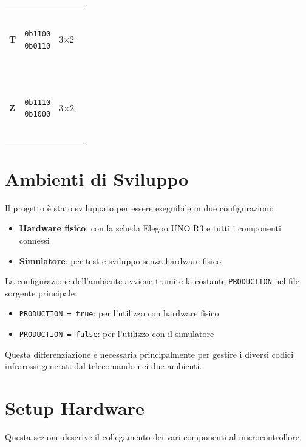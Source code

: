 \documentclass[a4paper, 12pt]{article}
\newcommand{\RedBlock}{\colorbox{red}{\rule{1.2ex}{1.2ex}}}      %
\newcommand{\WhiteBlock}{\fcolorbox{black}{white}{\rule{1.2ex}{1.2ex}}} %
\begin{document}
\begin{table}[H]
\begin{tabular}{
		>{\bfseries}l   %
		c               %
		c               %
		l               %
		}
		\addlinespace
		T     & \makecell{\texttt{0b1100}                                                 \\\texttt{0b0110}}
		& 3\(\times\)2
		& \makecell{\RedBlock\RedBlock\WhiteBlock\WhiteBlock                        \\\WhiteBlock\RedBlock\RedBlock\WhiteBlock} \\
		\addlinespace
		Z     & \makecell{\texttt{0b1110}                                                 \\\texttt{0b1000}}
		& 3\(\times\)2
		& \makecell{\RedBlock\RedBlock\RedBlock\WhiteBlock                          \\\RedBlock\WhiteBlock\WhiteBlock\WhiteBlock} \\
		\bottomrule
	\end{tabular}
\end{table}

\section{Ambienti di Sviluppo}
\label{sec:ambienti}
Il progetto è stato sviluppato per essere eseguibile in due configurazioni:
\begin{itemize}
	\item \textbf{Hardware fisico}: con la scheda Elegoo UNO R3 e tutti i componenti connessi
	\item \textbf{Simulatore}: per test e sviluppo senza hardware fisico
\end{itemize}

La configurazione dell'ambiente avviene tramite la costante \texttt{PRODUCTION} nel file sorgente principale:
\begin{itemize}
	\item \texttt{PRODUCTION = true}: per l'utilizzo con hardware fisico
	\item \texttt{PRODUCTION = false}: per l'utilizzo con il simulatore
\end{itemize}

Questa differenziazione è necessaria principalmente per gestire i diversi codici infrarossi generati dal telecomando nei due ambienti.

\section{Setup Hardware}
\label{sec:setup}
Questa sezione descrive il collegamento dei vari componenti al microcontrollore.
\end{document}
